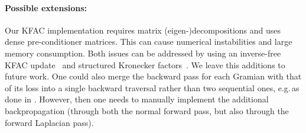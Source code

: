 \paragraph{Possible extensions:} Our KFAC implementation requires matrix (eigen-)decompositions and uses dense pre-conditioner matrices.
This can cause numerical instabilities and large memory consumption.
Both issues can be addressed by using an inverse-free KFAC update~\cite{lin2023simplifying} and structured Kronecker factors~\cite{lin2023structured}.
We leave this additions to future work.
One could also merge the backward pass for each Gramian with that of its loss into a single backward traversal rather than two sequential ones, e.g.\,as done in \cite{dangel2020backpack}.
However, then one needs to manually implement the additional backpropagation (through both the normal forward pass, but also through the forward Laplacian pass).

